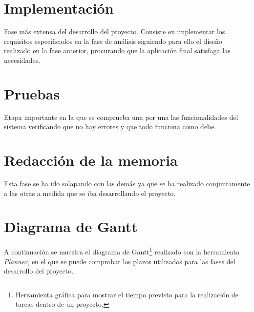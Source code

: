 \section{Implementación}

Fase más extensa del desarrollo del proyecto. Consiste en implementar los requisitos especificados en la fase de análisis siguiendo para ello el diseño realizado en la fase anterior, procurando que la aplicación final satisfaga las necesidades.

\section{Pruebas}

Etapa importante en la que se comprueba una por una las funcionalidades del sistema verificando que no hay errores y que todo funciona como debe.

\section{Redacción de la memoria}
Esta fase se ha ido solapando con las demás ya que se ha realizado conjuntamente a las otras a medida que se iba desarrollando el proyecto. 

\section{Diagrama de Gantt}
A continuación se muestra el diagrama de Gantt\footnote{Herramienta gráfica para mostrar el tiempo previsto para la realización de tareas dentro de un proyecto.} realizado con la herramienta {\em Planner}, en el que se puede comprobar los plazos utilizados para las fases del desarrollo del proyecto.
\newpage




